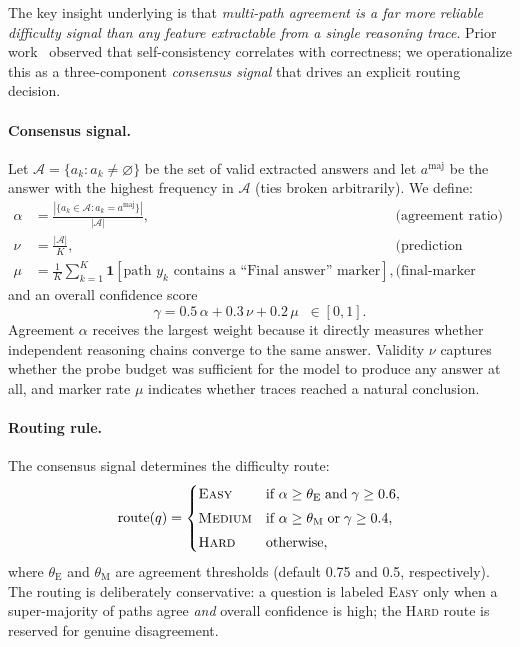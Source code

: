 The key insight underlying \method{} is that \emph{multi-path agreement is a
far more reliable difficulty signal than any feature extractable from a
single reasoning trace}.
Prior work~\citep{wang2023selfconsistency} observed that self-consistency
correlates with correctness; we operationalize this as a three-component
\emph{consensus signal} that drives an explicit routing decision.

\paragraph{Consensus signal.}
Let $\mathcal{A} = \{a_k : a_k \neq \varnothing\}$ be the set of valid
extracted answers and let $a^{\mathrm{maj}}$ be the answer with the highest
frequency in $\mathcal{A}$ (ties broken arbitrarily).
We define:
\begin{align}
  \label{eq:agreement}
  \alpha &= \frac{|\{a_k \in \mathcal{A} : a_k = a^{\mathrm{maj}}\}|}
                  {|\mathcal{A}|},
  &\quad&\text{(agreement ratio)}\\[4pt]
  \label{eq:validity}
  \nu &= \frac{|\mathcal{A}|}{K},
  &\quad&\text{(prediction validity)}\\[4pt]
  \label{eq:marker}
  \mu &= \frac{1}{K}\sum_{k=1}^{K}
         \mathbf{1}[\text{path } y_k \text{ contains a ``Final answer'' marker}],
  &\quad&\text{(final-marker rate)}
\end{align}
and an overall confidence score
\begin{equation}
  \label{eq:confidence}
  \gamma = 0.5\,\alpha + 0.3\,\nu + 0.2\,\mu \;\;\in [0, 1].
\end{equation}
Agreement $\alpha$ receives the largest weight because it directly measures
whether independent reasoning chains converge to the same answer.
Validity $\nu$ captures whether the probe budget was sufficient for the model
to produce any answer at all, and marker rate $\mu$ indicates whether traces
reached a natural conclusion.

\paragraph{Routing rule.}
The consensus signal determines the difficulty route:
\begin{equation}
  \label{eq:routing}
  \mathrm{route}(q) =
  \begin{cases}
    \textsc{Easy}
      & \text{if } \alpha \geq \theta_{\mathrm{E}} \;\text{and}\; \gamma \geq 0.6, \\[3pt]
    \textsc{Medium}
      & \text{if } \alpha \geq \theta_{\mathrm{M}} \;\text{or}\; \gamma \geq 0.4, \\[3pt]
    \textsc{Hard}
      & \text{otherwise},
  \end{cases}
\end{equation}
where $\theta_{\mathrm{E}}$ and $\theta_{\mathrm{M}}$ are agreement
thresholds (default 0.75 and 0.5, respectively).
The routing is deliberately conservative: a question is labeled \textsc{Easy}
only when a super-majority of paths agree \emph{and} overall confidence is
high; the \textsc{Hard} route is reserved for genuine disagreement.

